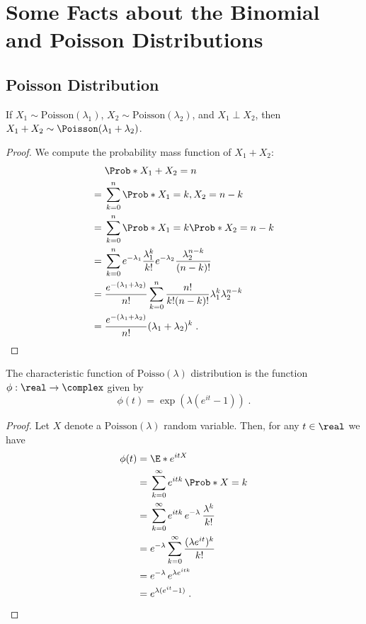 \chapter{Some Facts about the Binomial and Poisson Distributions}

\section{Poisson Distribution}

\begin{fact}\label{Fact:poissonsum}
If $X_1\sim\mathrm{Poisson}(\lambda_1)$,
$X_2\sim\mathrm{Poisson}(\lambda_2)$,
and $X_1\perp X_2$, then 
$X_1+X_2\sim\Poisson(\lambda_1+\lambda_2)$.
\end{fact}

\begin{proof}
We compute the probability mass function of $X_1+X_2$:
\begin{align*}
   & \Prob*{X_1+X_2=n}\\    
={}& \sum_{k=0}^n \Prob*{X_1=k,X_2=n-k}\\
={}& \sum_{k=0}^n \Prob*{X_1=k}\Prob*{X_2=n-k}\\
={}& \sum_{k=0}^n e^{-\lambda_1}\frac{\lambda_1^k}{k!}
e^{-\lambda_2}\frac{\lambda_2^{n-k}}{(n-k)!}\\
={}& 
\frac{e^{-(\lambda_1+\lambda_2)}}{n!}
\sum_{k=0}^n \frac{n!}{k!(n-k)!}\lambda_1^k\lambda_2^{n-k}\\
={}&\frac{e^{-(\lambda_1+\lambda_2)}}{n!}
(\lambda_1+\lambda_2)^k\;.
\end{align*}
\end{proof}

\begin{fact}
The characteristic function of $\mathrm{Poisso}(\lambda)$ distribution is the function $\phi:\real\to\complex$ given by 
\[
\phi(t) = \exp\left(\lambda(e^{it}-1)\right) \;.
\]
\end{fact}

\begin{proof}
Let $X$ denote a $\mathrm{Poisson}(\lambda)$ random variable. Then, for any $t\in\real$ we have
\begin{align*}
\phi(t) ={} & \E*{e^{itX}}\\
={} & \sum_{k=0}^\infty e^{itk} \, \Prob*{X=k}\\
={} & \sum_{k=0}^\infty e^{itk} \, e^{-\lambda} \, \frac{\lambda^k}{k!}\\
={} & e^{-\lambda} \sum_{k=0}^\infty \frac{(\lambda e^{it})^k}{k!}\\
={} & e^{-\lambda} \, e^{\lambda e^{itk}}\\
={} & e^{\lambda (e^{it}-1)}\;.
\end{align*}
\end{proof}

